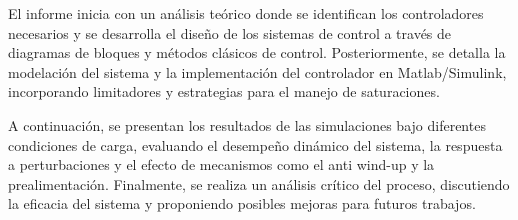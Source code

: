 El informe inicia con un análisis teórico donde se identifican los controladores necesarios y se desarrolla el diseño de los sistemas de control a través de diagramas de bloques y métodos clásicos de control. Posteriormente, se detalla la modelación del sistema y la implementación del controlador en Matlab/Simulink, incorporando limitadores y estrategias para el manejo de saturaciones.

A continuación, se presentan los resultados de las simulaciones bajo diferentes condiciones de carga, evaluando el desempeño dinámico del sistema, la respuesta a perturbaciones y el efecto de mecanismos como el anti wind-up y la prealimentación. Finalmente, se realiza un análisis crítico del proceso, discutiendo la eficacia del sistema y proponiendo posibles mejoras para futuros trabajos.
